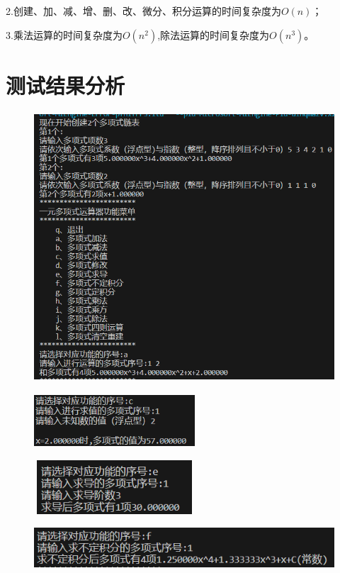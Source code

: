 \documentclass{ctexart}
\begin{document}
	2.创建、加、减、增、删、改、微分、积分运算的时间复杂度为$O(n)$；
	
	3.乘法运算的时间复杂度为$O(n^2)$,除法运算的时间复杂度为$O(n^3)$。
	\section{测试结果分析}
	\begin{figure}[H]
		\centering 
		\includegraphics[height=10cm,width=14cm]{1.png}
		\end{figure}
		\begin{figure}[H]
		\centering 
		\includegraphics[height=2cm,width=6cm]{2.png}
		\end{figure}
		\begin{figure}[H]
		\centering 
		\includegraphics[height=2cm,width=6cm]{4.png}
		\end{figure}
		\begin{figure}[H]
		\centering 
		\includegraphics[height=1.5cm,width=12cm]{5.png}
		\end{figure}
\end{document}
